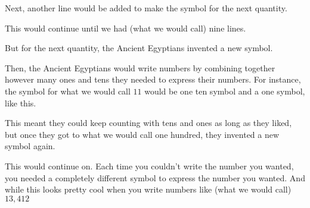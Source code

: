 \documentclass{ximera}
\begin{document}
Next, another line would be added to make the symbol for the next quantity.


\begin{center}
\end{center}


This would continue until we had (what we would call) nine lines.

\begin{center}
\end{center}


But for the next quantity, the Ancient Egyptians invented a new symbol.

\begin{center}
\end{center}


Then, the Ancient Egyptians would write numbers by combining together however many ones and tens they needed to express their numbers. For instance, the symbol for what we would call $11$ would be one ten symbol and a one symbol, like this.

\begin{center}
\end{center}

 This meant they could keep counting with tens and ones as long as they liked, but once they got to what we would call one hundred, they invented a new symbol again.

\begin{center}
\end{center}

This would continue on. Each time you couldn't write the number you wanted, you needed a completely different symbol to express the number you wanted. And while this looks pretty cool when you write numbers like (what we would call) $13,412$
\end{document}

